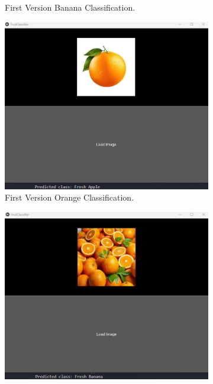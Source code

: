 \documentclass[conference]{IEEEtran}
\begin{document}
\begin{figure}[h]
\begin{subfigure}[b]{0.48\linewidth}
        \caption{First Version Banana Classification.}
        \label{figFB}
    \end{subfigure}
    \hfill
    \begin{subfigure}[b]{0.48\linewidth}
        \centering
        \includegraphics[width=\linewidth]{1layer orage1.png}
        \caption{First Version Orange Classification.}
        \label{figFA}
    \end{subfigure}
    \hfill
    \begin{subfigure}[b]{0.48\linewidth}
        \centering
        \includegraphics[width=\linewidth]{1layer orage2.png}

\end{subfigure}
\end{figure}
\end{document}
